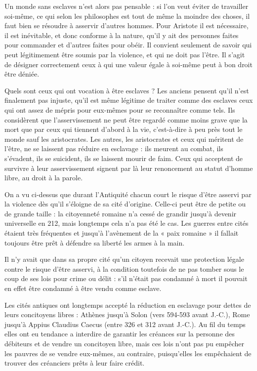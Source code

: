  Un monde sans esclaves n'est alors pas pensable : si l'on veut éviter de travailler soi-même, ce qui selon les philosophes est tout de même la moindre des choses, il faut bien se résoudre à asservir d'autres hommes. Pour Aristote il est nécessaire, il est inévitable, et donc conforme à la nature, qu'il y ait des personnes faites pour commander et d'autres faites pour obéir. Il convient seulement de savoir qui peut légitimement être soumis par la violence, et qui ne doit pas l'être. Il s'agit de désigner correctement ceux à qui une valeur égale à soi-même peut à bon droit être déniée. 

 Quels sont ceux qui ont vocation à être esclaves ? Les anciens pensent qu'il n'est finalement pas injuste, qu'il est même légitime de traiter comme des esclaves ceux qui ont assez de mépris pour eux-mêmes pour se reconnaître comme tels. Ils considèrent que l'asservissement ne peut être regardé comme moins grave que la mort que par ceux qui tiennent d'abord à la vie, c'est-à-dire à peu près tout le monde sauf les aristocrates. Les autres, les aristocrates et ceux qui méritent de l'être, ne se laissent pas réduire en esclavage : ils meurent au combat, ils s'évadent, ils se suicident, ils se laissent mourir de faim. Ceux qui acceptent de survivre à leur asservissement signent par là leur renoncement au statut d'homme libre, au droit à la parole. 

On a vu ci-dessus que durant l'Antiquité chacun court le risque
d'être asservi par la violence dès qu'il s'éloigne de sa cité d'origine. Celle-ci peut être de petite ou de grande taille : la citoyenneté romaine n'a cessé de grandir jusqu'à devenir universelle en 212, mais longtemps cela n'a pas été le cas. Les guerres entre cités étaient très fréquentes
et jusqu'à l'avènement de la « paix romaine » il fallait toujours être prêt
à défendre sa liberté les armes à la main.

Il n'y avait que dans sa propre cité qu'un citoyen recevait une protection
légale contre le risque d'être asservi, à la condition toutefois de ne
pas tomber sous le coup de ses lois pour crime ou délit : s'il n'était pas
condamné à mort il pouvait en effet être condamné à être vendu comme
esclave.

Les cités antiques ont longtemps accepté la réduction en esclavage
pour dettes de leurs concitoyens libres : Athènes jusqu'à \hbox{Solon} (vers
594-593 avant J.-C.), Rome jusqu'à \hbox{Appius} \hbox{Claudius} \hbox{Caecus} (entre 326 et 312
avant J.-C.). Au fil du temps elles ont eu tendance a interdire de garantir
les créances sur la personne des débiteurs et de vendre un concitoyen libre, mais ces lois n'ont pas pu empêcher les pauvres de se vendre eux-mêmes,
au contraire, puisqu'elles les empêchaient de trouver des créanciers prêts
à leur faire crédit. 

